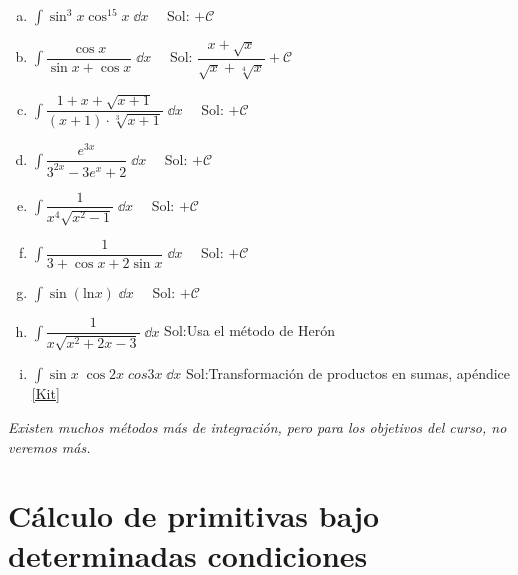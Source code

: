 {\begin{enumerate}[a) ]

\item $\displaystyle \int  \sin^3 x \cos^{15} x \; \dd x \quad $ 
\textcolor{gris}{Sol: $  +\mathcal C$}

\item $\displaystyle \int \dfrac {\cos x}{\sin x + \cos x}  \; \dd x \quad $ 
\textcolor{gris}{Sol: $ \dfrac {x+\sqrt{x}}{\sqrt{x}+\sqrt[4]{x}} +\mathcal C$}

\item $\displaystyle \int  \dfrac {1+x+\sqrt{x+1}}{(x+1)\cdot \sqrt[3]{x+1}} \; \dd x \quad $ 
\textcolor{gris}{Sol: $  +\mathcal C$}

\item $\displaystyle \int  \dfrac {e^{3x}}{3^{2x}-3 e^x+2} \; \dd x \quad $ 
\textcolor{gris}{Sol: $  +\mathcal C$}

\item $\displaystyle \int  \dfrac {1}{x^4 \sqrt{x^2-1}} \; \dd x \quad $ 
\textcolor{gris}{Sol: $  +\mathcal C$}

\item $\displaystyle \int  \dfrac {1}{3+\cos x + 2\sin x} \; \dd x \quad $ 
\textcolor{gris}{Sol: $  +\mathcal C$}

\item $\displaystyle \int  \sin ( \mathrm{ln }x ) \; \dd x \quad $ 
\textcolor{gris}{Sol: $  +\mathcal C$}

\item $\displaystyle \int  \dfrac {1}{x \sqrt{x^2+2x-3}} \; \dd x $ 
\textcolor{gris}{Sol:Usa el método de Herón  }

\item $\displaystyle \int \sin x \; \cos 2x \; cos 3x \; \dd x  $
\textcolor{gris}{Sol:Transformación de productos en sumas, apéndice \ref{Kit} }

\end{enumerate}

\vspace{4mm}
\emph{Existen muchos métodos más de integración, pero para los objetivos del curso, no veremos más.}

\section{Cálculo de primitivas bajo determinadas condiciones}


}

